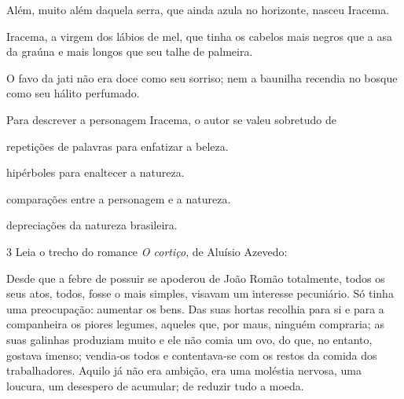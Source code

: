 {\begin{myquote}
Além, muito além daquela serra, que ainda azula no
horizonte, nasceu Iracema.

Iracema, a virgem dos lábios de mel, que tinha os
cabelos mais negros que a asa da graúna e mais longos
que seu talhe de palmeira.

O favo da jati não era doce como seu sorriso; nem
a baunilha recendia no bosque como seu hálito perfumado.

\end{myquote}



Para descrever a personagem Iracema, o autor se valeu sobretudo de

\begin{escolha}

  \item repetições de palavras para enfatizar a beleza. 

  \item hipérboles para enaltecer a natureza.

  \item comparações entre a personagem e a natureza.

  \item depreciações da natureza brasileira.

\end{escolha}

\num{3} Leia o trecho do romance \textit{O cortiço}, de Aluísio Azevedo:



\begin{myquote}

Desde que a febre de possuir se apoderou de João Romão totalmente, todos os seus atos, todos, 
fosse o mais simples, visavam um interesse pecuniário. Só tinha uma preocupação: aumentar 
os bens. Das suas hortas recolhia para si e para a companheira os piores legumes, aqueles que,
por maus, ninguém compraria; as suas galinhas produziam muito e ele não comia um ovo, do que, 
no entanto, gostava imenso; vendia-os todos e contentava-se com os restos da comida dos 
trabalhadores. Aquilo já não era ambição, era uma moléstia nervosa, uma loucura, um desespero
de acumular; de reduzir tudo a moeda.


\end{myquote}}
